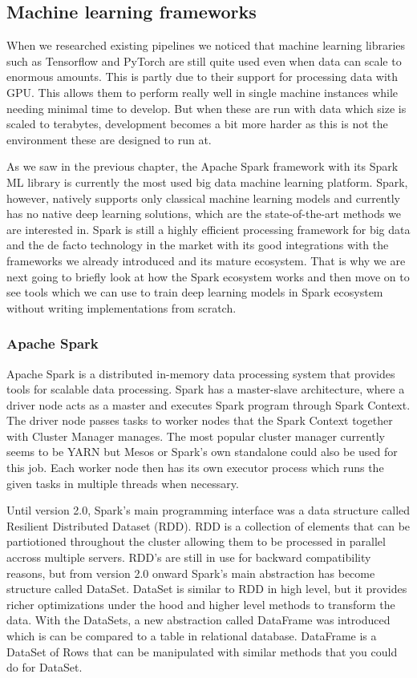 \subsection{Machine learning frameworks}

When we researched existing pipelines we noticed that machine learning libraries such as Tensorflow and PyTorch are still quite used even when data can scale to enormous amounts.
This is partly due to their support for processing data with GPU.
This allows them to perform really well in single machine instances while needing minimal time to develop.
But when these are run with data which size is scaled to terabytes, development becomes a bit more harder as this is not the environment these are designed to run at.

As we saw in the previous chapter, the Apache Spark framework with its Spark ML library is currently the most used big data machine learning platform.
Spark, however, natively supports only classical machine learning models and currently has no native deep learning solutions, which are the state-of-the-art methods we are interested in.
Spark is still a highly efficient processing framework for big data and the de facto technology in the market with its good integrations with the frameworks we already introduced and its mature ecosystem.
That is why we are next going to briefly look at how the Spark ecosystem works and then move on to see tools which we can use to train deep learning models in Spark ecosystem without writing implementations from scratch.

\subsubsection{Apache Spark}

Apache Spark is a distributed in-memory data processing system that provides tools for scalable data processing.
Spark has a master-slave architecture, where a driver node acts as a master and executes Spark program through Spark Context.
The driver node passes tasks to worker nodes that the Spark Context together with Cluster Manager manages.
The most popular cluster manager currently seems to be YARN but Mesos or Spark's own standalone could also be used for this job. 
Each worker node then has its own executor process which runs the given tasks in multiple threads when necessary.\cite{spark}

Until version 2.0, Spark's main programming interface was a data structure called Resilient Distributed Dataset (RDD).
RDD is a collection of elements that can be partiotioned throughout the cluster allowing them to be processed in parallel accross multiple servers.
RDD's are still in use for backward compatibility reasons, but from version 2.0 onward Spark's main abstraction has become structure called DataSet.
DataSet is similar to RDD in high level, but it provides richer optimizations under the hood and higher level methods to transform the data.
With the DataSets, a new abstraction called DataFrame was introduced which is can be compared to a table in relational database.
DataFrame is a DataSet of Rows that can be manipulated with similar methods that you could do for DataSet.\cite{spark}

